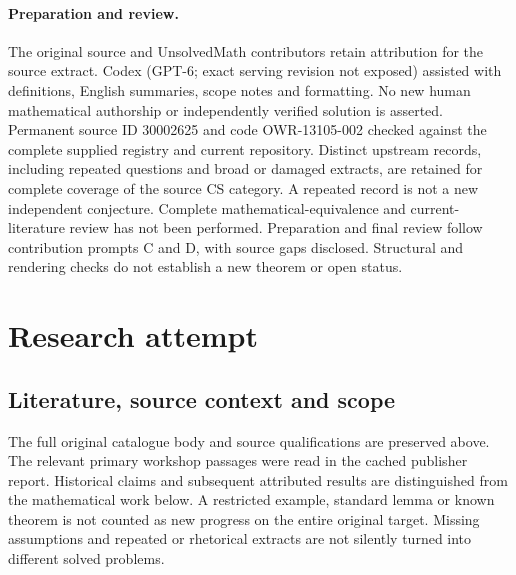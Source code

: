 \documentclass[11pt]{article}
\begin{document}
\paragraph{Preparation and review.}
The original source and UnsolvedMath contributors retain attribution for the source extract. Codex (GPT-6; exact serving revision not exposed) assisted with definitions, English summaries, scope notes and formatting. No new human mathematical authorship or independently verified solution is asserted. Permanent source ID 30002625 and code OWR-13105-002 checked against the complete supplied registry and current repository. Distinct upstream records, including repeated questions and broad or damaged extracts, are retained for complete coverage of the source CS category. A repeated record is not a new independent conjecture. Complete mathematical-equivalence and current-literature review has not been performed. Preparation and final review follow contribution prompts C and D, with source gaps disclosed. Structural and rendering checks do not establish a new theorem or open status.
\label{end:30002625}

\section{Research attempt}
\subsection{Literature, source context and scope}
The full original catalogue body and source qualifications are preserved above. The relevant primary workshop passages were read in the cached publisher report. Historical claims and subsequent attributed results are distinguished from the mathematical work below. A restricted example, standard lemma or known theorem is not counted as new progress on the entire original target. Missing assumptions and repeated or rhetorical extracts are not silently turned into different solved problems.
\end{document}
